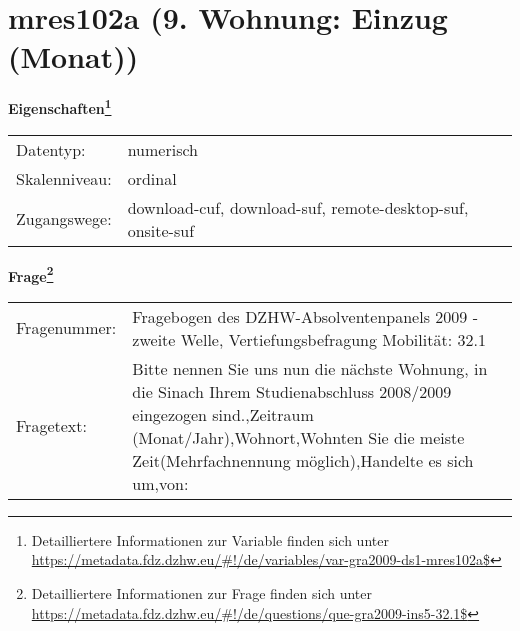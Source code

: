 
    \setcounter{footnote}{0}

    \vspace*{-1.8cm}
	\section{mres102a (9. Wohnung: Einzug (Monat))}
	\label{section:mres102a}



    \vspace*{0.5cm}
    \noindent\textbf{Eigenschaften\footnote{Detailliertere Informationen zur Variable finden sich unter
		\url{https://metadata.fdz.dzhw.eu/\#!/de/variables/var-gra2009-ds1-mres102a$}}}\\
	\begin{tabularx}{\hsize}{@{}lX}
	Datentyp: & numerisch \\
	Skalenniveau: & ordinal \\
	Zugangswege: &
	  download-cuf, 
	  download-suf, 
	  remote-desktop-suf, 
	  onsite-suf
 \\
    \end{tabularx}



				\vspace*{0.5cm}
                \noindent\textbf{Frage\footnote{Detailliertere Informationen zur Frage finden sich unter
		              \url{https://metadata.fdz.dzhw.eu/\#!/de/questions/que-gra2009-ins5-32.1$}}}\\
				\begin{tabularx}{\hsize}{@{}lX}
					Fragenummer: &
					  Fragebogen des DZHW-Absolventenpanels 2009 - zweite Welle, Vertiefungsbefragung Mobilität:
					  32.1
 \\
					Fragetext: & Bitte nennen Sie uns nun die nächste Wohnung, in die Sinach Ihrem Studienabschluss 2008/2009 eingezogen sind.,Zeitraum (Monat/Jahr),Wohnort,Wohnten Sie die meiste Zeit(Mehrfachnennung möglich),Handelte es sich um,von: \\
				\end{tabularx}





